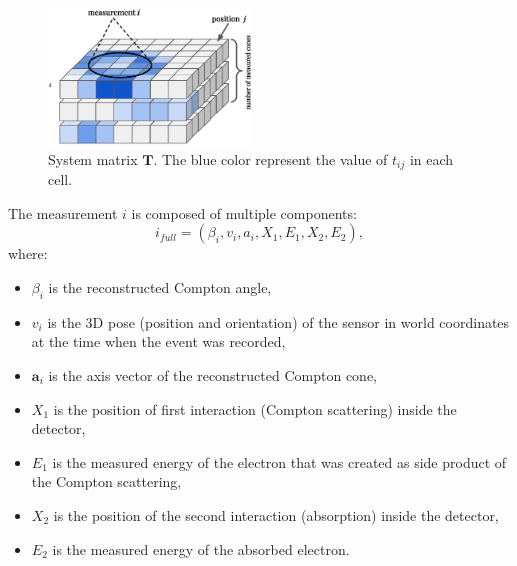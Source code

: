 \begin{figure}[!h]
  \centering
    \includegraphics[width=0.48\textwidth]{./fig/photos/sys.eps}
  \caption{System matrix $\mathbf{T}$. The blue color represent the value of $t_{ij}$ in each cell.}
    \label{fig:sys_ilustration}
\end{figure}


The measurement $i$ is composed of multiple components:
\begin{equation}
  i_{full} = (\beta_{i}, v_{i}, a_{i}, X_{1}, E_{1}, X_{2}, E_{2}),
\end{equation}
where:
\begin{itemize}
  \item $\beta_{i}$ is the reconstructed Compton angle,
  \item $v_{i}$ is the 3D pose (position and orientation) of the sensor in world coordinates at the time when the event was recorded,
  \item $\mathbf{a}_{i}$ is the axis vector of the reconstructed Compton cone,
  \item $X_{1}$ is the position of first interaction (Compton scattering) inside the detector,
  \item $E_{1}$ is the measured energy of the electron that was created as side product of the Compton scattering,
  \item $X_{2}$ is the position of the second interaction (absorption) inside the detector,
  \item $E_{2}$ is the measured energy of the absorbed electron.
\end{itemize}

